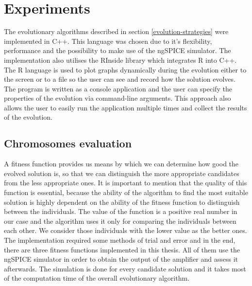 \chapter{Experiments}
The evolutionary algorithms described in section \ref{evolution-strategies} were implemented in C++. This language was chosen due to it's flexibility, performance and the possibility to make use of the ngSPICE simulator. The implementation also utilises the RInside library which integrates R into C++. The R language is used to plot graphs dynamically during the evolution either to the screen or to a file so the user can see and record how the solution evolves.\\
The program is written as a console application and the user can specify the properties of the evolution via command-line arguments. This approach also allows the user to easily run the application multiple times and collect the results of the evolution.

\section{Chromosomes evaluation} \label{chromosomes-evaluation}
A fitness function provides us means by which we can determine how good the evolved solution is, so that we can distinguish the more appropriate candidates from the less appropriate ones. It is important to mention that the quality of this function is essential, because the ability of the algorithm to find the most suitable solution is highly dependent on the ability of the fitness function to distinguish between the individuals. The value of the function is a positive real number in our case and the algorithm uses it only for comparing the individuals between each other. We consider those individuals with the lower value as the better ones.\\
The implementation required some methods of trial and error and in the end, there are three fitness functions implemented in this thesis. All of them use the ngSPICE simulator in order to obtain the output of the amplifier and assess it afterwards. The simulation is done for every candidate solution and it takes most of the computation time of the overall evolutionary algorithm.

